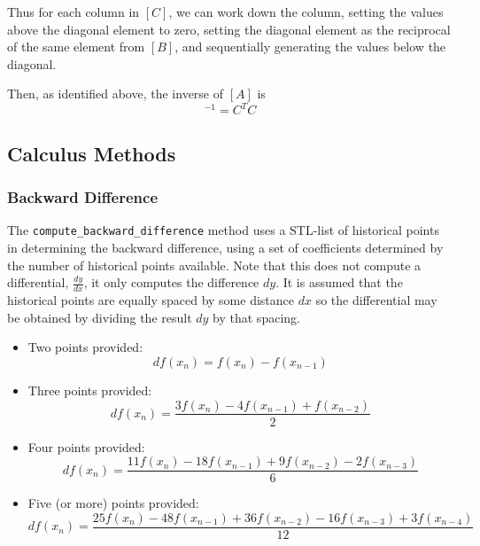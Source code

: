 \documentclass[11pt,fleqn]{report}
\begin{document}
Thus for each column in $[C]$, we can work down the column, setting the
values above the diagonal element to zero, setting the diagonal element as
the reciprocal of the same element from $[B]$, and sequentially generating
the values below the diagonal.

Then, as identified above, the inverse of $[A]$ is
\begin{equation}
[A]^{-1} = C^T C
\end{equation}


\subsection{Calculus Methods}

\subsubsection{Backward Difference}
The \texttt{compute\_backward\_difference} method 
uses a STL-list of historical points in determining the
backward difference, using a set of coefficients determined by the number
of historical points available. Note that this does not compute a
differential, $\frac {dy}{dx}$, it only computes the difference $dy$.
It is assumed that the historical points are equally spaced by some
distance $dx$ so the differential may be obtained by dividing the
result $dy$ by that spacing.

\begin{itemize}
\item Two points provided:
\begin{equation*}
df(x_n) = f(x_n) - f(x_{n-1})
\end{equation*}
\item Three points provided:
\begin{equation*}
df(x_n) = \frac{3 f(x_n) - 4 f(x_{n-1}) + f(x_{n-2})}{2}
\end{equation*}
\item Four points provided:
\begin{equation*}
df(x_n) = \frac{11 f(x_n) - 18 f(x_{n-1}) + 9 f(x_{n-2}) - 2f(x_{n-3})}{6}
\end{equation*}
\item Five (or more) points provided:
 \begin{equation*}
 df(x_n) = \frac{ 25 f(x_n) - 48 f(x_{n-1}) + 36 f(x_{n-2}) -
16 f(x_{n-3}) + 3 f(x_{n-4})}
{ 12}
 \end{equation*}
\end{itemize}
\end{document}
